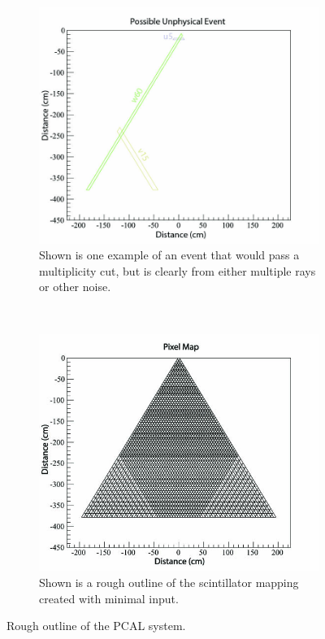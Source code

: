 \begin{figure}[h]
    \centering
    \begin{subfigure}[h]{0.44\textwidth}
        \centering
        \includegraphics[width=\textwidth, keepaspectratio = true]{unphysical}
        \caption{Shown is one example of an event that would pass a multiplicity cut, but is clearly from either multiple rays or other noise.}
        \label{fig:unphysical}
    \end{subfigure}
    ~
    \begin{subfigure}[h]{0.44\textwidth}
        \centering
        \includegraphics[width=\textwidth, keepaspectratio = true]{pixelmap}
        \caption{Shown is a rough outline of the scintillator mapping created with minimal input.}
        \label{fig:pixelmap}
    \end{subfigure}
    \caption{Rough outline of the PCAL system.}
    \label{fig:pixelexplain}
\end{figure}

